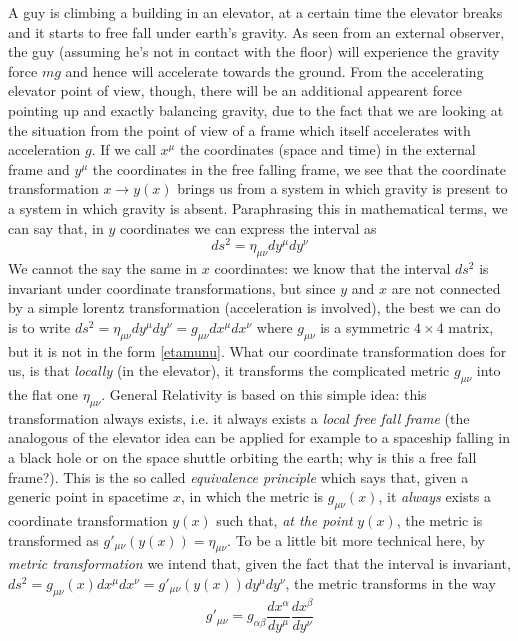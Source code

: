 \documentclass[11pt, a4paper,oneside,openright]{book}
\numberwithin{equation}{section}
\begin{document}
A guy is climbing a building in an elevator, at a certain time the elevator breaks and it starts to free fall under earth's gravity. As seen from an external observer, the guy (assuming he's not in contact with the floor) will experience the gravity force $mg$ and hence will accelerate towards the ground. From the accelerating elevator point of view, though, there will be an additional appearent force pointing up and exactly balancing gravity, due to the fact that we are looking at the situation from the point of view of a frame which itself accelerates with acceleration $g$. If we call $x^\mu$ the coordinates (space and time) in the external frame and $y^\mu$ the coordinates in the free falling frame, we see that the coordinate transformation $x\rightarrow y(x)$ brings us from a system in which gravity is present to a system in which gravity is absent. Paraphrasing this in mathematical terms, we can say that, in $y$ coordinates we can express the interval as
\begin{equation}
ds^2=\eta_{\mu\nu}dy^\mu dy^\nu
\end{equation}
We cannot the say the same in $x$ coordinates: we know that the interval $ds^2$ is invariant under coordinate transformations, but since $y$ and $x$ are not connected by a simple lorentz transformation (acceleration is involved), the best we can do is to write $ds^2=\eta_{\mu\nu}dy^\mu dy^\nu=g_{\mu\nu}dx^\mu dx^\nu$ where $g_{\mu\nu}$ is a symmetric $4\times4$ matrix, but it is not in the form \ref{etamunu}. What our coordinate transformation does for us, is that \textit{locally} (in the elevator), it transforms the complicated metric $g_{\mu\nu}$ into the flat one $\eta_{\mu\nu}$. General Relativity is based on this simple idea: this transformation always exists, i.e. it always exists a \textit{local free fall frame} (the analogous of the elevator idea can be applied for example to a spaceship falling in a black hole or on the space shuttle orbiting the earth; why is this a free fall frame?). This is the so called \textit{equivalence principle} which says that, given a generic point in spacetime $x$, in 
which the metric is $g_{\mu\nu}(x)$, it \textit{always} exists a coordinate transformation $y(x)$ such that, \textit{at the point} $y(x)$, the metric is transformed as $g'_{\mu\nu}(y(x))=\eta_{\mu\nu}$. To be a little bit more technical here, by \textit{metric transformation} we intend that, given the fact that the interval is invariant, $ds^2=g_{\mu\nu}(x)dx^\mu dx^\nu=g'_{\mu\nu}(y(x))dy^\mu dy^\nu$, the metric transforms in the way
\begin{equation}
g'_{\mu\nu}=g_{\alpha\beta}\frac{dx^\alpha}{dy^\mu}\frac{dx^\beta}{dy^\nu}
\end{equation}
\end{document}
